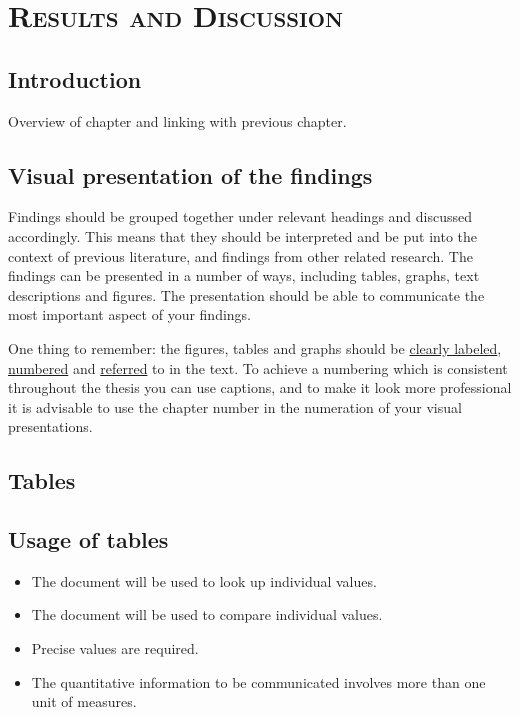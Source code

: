 %
%
% 
% 
% 


\chapter{\textsc{Results and Discussion}}
\label{chap:results}

\section{Introduction}
\label{sec:introchapter4}

Overview of chapter and linking with previous chapter.

\section{Visual presentation of the findings}
\label{sec:visualrep}

Findings should be grouped together under relevant headings and discussed accordingly. This means that they should be interpreted and be 
put into the context of previous literature, and findings from other related research. The findings can be presented in a number of ways, 
including tables, graphs, text descriptions and figures. The presentation should be able to communicate the most important aspect of your findings. 

One thing to remember: the figures, tables and graphs should be \underline{clearly labeled}, \underline{numbered} and \underline{referred} to in the text. To achieve a numbering which 
is consistent throughout the thesis you can use captions, and to make it look more professional it is advisable to use the chapter number in the numeration of your visual presentations. 

\section{Tables}
\label{sec:tables}

\section{Usage of tables}
\label{sec:usagetables}

\begin{itemize}
\item The document will be used to look up individual values.
\item The document will be used to compare individual values.
\item Precise values are required.
\item The quantitative information to be communicated involves more than one unit of measures.
\end{itemize}

